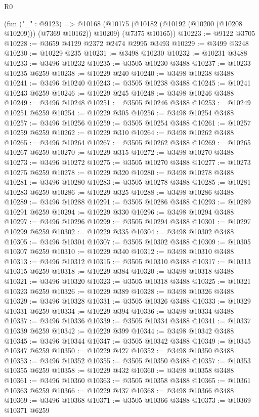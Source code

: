 \begin{lexlean}{R0}
\begin{coremodule}
    (fun ("_" : @9123) =>
    @10168 (@10175 (@10182 (@10192 (@10200 (@10208 @10209))) (@7369 @10162)) @10209) (@7375 @10165))
@10223 := @9122 @3705
@10228 := @3659 @4129 @2372 @2474 @2995 @3493
@10229 := @3499 @3248
@10230 := @10229 @235
@10231 := @3498 @10230
@10232 := @10231 @3488
@10233 := @3496 @10232
@10235 := @3505 @10230 @3488
@10237 := @10233 @10235 @6259
@10238 := @10229 @240
@10240 := @3498 @10238 @3488
@10241 := @3496 @10240
@10243 := @3505 @10238 @3488
@10245 := @10241 @10243 @6259
@10246 := @10229 @245
@10248 := @3498 @10246 @3488
@10249 := @3496 @10248
@10251 := @3505 @10246 @3488
@10253 := @10249 @10251 @6259
@10254 := @10229 @305
@10256 := @3498 @10254 @3488
@10257 := @3496 @10256
@10259 := @3505 @10254 @3488
@10261 := @10257 @10259 @6259
@10262 := @10229 @310
@10264 := @3498 @10262 @3488
@10265 := @3496 @10264
@10267 := @3505 @10262 @3488
@10269 := @10265 @10267 @6259
@10270 := @10229 @315
@10272 := @3498 @10270 @3488
@10273 := @3496 @10272
@10275 := @3505 @10270 @3488
@10277 := @10273 @10275 @6259
@10278 := @10229 @320
@10280 := @3498 @10278 @3488
@10281 := @3496 @10280
@10283 := @3505 @10278 @3488
@10285 := @10281 @10283 @6259
@10286 := @10229 @325
@10288 := @3498 @10286 @3488
@10289 := @3496 @10288
@10291 := @3505 @10286 @3488
@10293 := @10289 @10291 @6259
@10294 := @10229 @330
@10296 := @3498 @10294 @3488
@10297 := @3496 @10296
@10299 := @3505 @10294 @3488
@10301 := @10297 @10299 @6259
@10302 := @10229 @335
@10304 := @3498 @10302 @3488
@10305 := @3496 @10304
@10307 := @3505 @10302 @3488
@10309 := @10305 @10307 @6259
@10310 := @10229 @340
@10312 := @3498 @10310 @3488
@10313 := @3496 @10312
@10315 := @3505 @10310 @3488
@10317 := @10313 @10315 @6259
@10318 := @10229 @384
@10320 := @3498 @10318 @3488
@10321 := @3496 @10320
@10323 := @3505 @10318 @3488
@10325 := @10321 @10323 @6259
@10326 := @10229 @389
@10328 := @3498 @10326 @3488
@10329 := @3496 @10328
@10331 := @3505 @10326 @3488
@10333 := @10329 @10331 @6259
@10334 := @10229 @394
@10336 := @3498 @10334 @3488
@10337 := @3496 @10336
@10339 := @3505 @10334 @3488
@10341 := @10337 @10339 @6259
@10342 := @10229 @399
@10344 := @3498 @10342 @3488
@10345 := @3496 @10344
@10347 := @3505 @10342 @3488
@10349 := @10345 @10347 @6259
@10350 := @10229 @427
@10352 := @3498 @10350 @3488
@10353 := @3496 @10352
@10355 := @3505 @10350 @3488
@10357 := @10353 @10355 @6259
@10358 := @10229 @432
@10360 := @3498 @10358 @3488
@10361 := @3496 @10360
@10363 := @3505 @10358 @3488
@10365 := @10361 @10363 @6259
@10366 := @10229 @437
@10368 := @3498 @10366 @3488
@10369 := @3496 @10368
@10371 := @3505 @10366 @3488
@10373 := @10369 @10371 @6259

\end{coremodule}
\end{lexlean}
